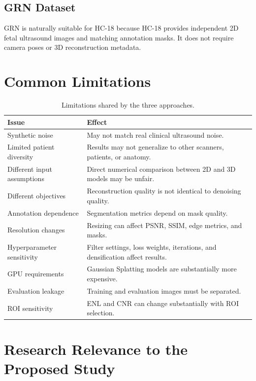 \documentclass[11pt,a4paper]{article}
\begin{document}
\subsection{GRN Dataset}
GRN is naturally suitable for HC-18 because HC-18 provides independent 2D fetal ultrasound images and matching annotation masks. It does not require camera poses or 3D reconstruction metadata.

\section{Common Limitations}

\begin{table}[h]
\centering
\caption{Limitations shared by the three approaches.}
\begin{tabular}{p{} p{}}
\toprule
Issue & Effect \\
\midrule
Synthetic noise & May not match real clinical ultrasound noise. \\
Limited patient diversity & Results may not generalize to other scanners, patients, or anatomy. \\
Different input assumptions & Direct numerical comparison between 2D and 3D models may be unfair. \\
Different objectives & Reconstruction quality is not identical to denoising quality. \\
Annotation dependence & Segmentation metrics depend on mask quality. \\
Resolution changes & Resizing can affect PSNR, SSIM, edge metrics, and masks. \\
Hyperparameter sensitivity & Filter settings, loss weights, iterations, and densification affect results. \\
GPU requirements & Gaussian Splatting models are substantially more expensive. \\
Evaluation leakage & Training and evaluation images must be separated. \\
ROI sensitivity & ENL and CNR can change substantially with ROI selection. \\
\bottomrule
\end{tabular}
\end{table}

\section{Research Relevance to the Proposed Study}
\end{document}
